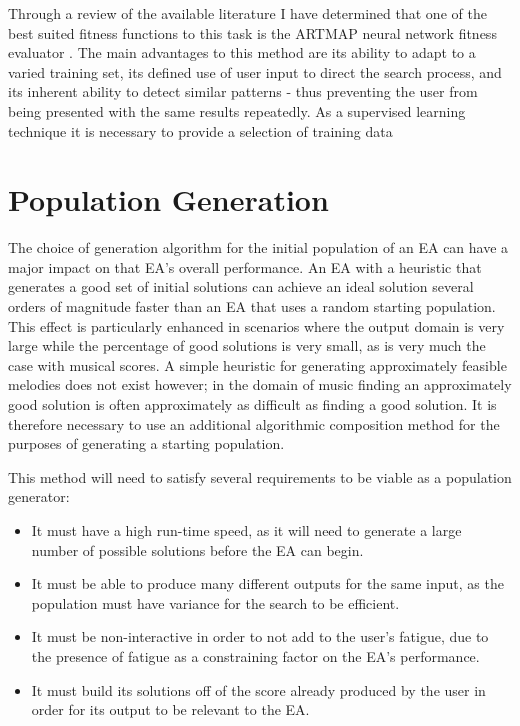 \documentclass[ author={Stephen Livermore-Tozer},
				supervisor={Dr. Peter Flach},
				degree={MEng},
				title={Performing Algorithmic Co-composition Using Machine Learning},
				subtitle={},
				type={research},
				year={2016} ]{dissertation}
\begin{document}
	Through a review of the available literature I have determined that one of the best suited fitness functions to this task is the ARTMAP neural network fitness evaluator \cite{burton1998hybrid}. The main advantages to this method are its ability to adapt to a varied training set, its defined use of user input to direct the search process, and its inherent ability to detect similar patterns - thus preventing the user from being presented with the same results repeatedly. As a supervised learning technique it is necessary to provide a selection of training data
	
	\section{Population Generation}
	\label{sec:pop-gen}
	
	The choice of generation algorithm for the initial population of an EA can have a major impact on that EA's overall performance. An EA with a heuristic that generates a good set of initial solutions can achieve an ideal solution several orders of magnitude faster than an EA that uses a random starting population. This effect is particularly enhanced in scenarios where the output domain is very large while the percentage of good solutions is very small, as is very much the case with musical scores. A simple heuristic for generating approximately feasible melodies does not exist however; in the domain of music finding an approximately good solution is often approximately as difficult as finding a good solution. It is therefore necessary to use an additional algorithmic composition method for the purposes of generating a starting population.
	
	This method will need to satisfy several requirements to be viable as a population generator:
	
	\begin{itemize}
		\item It must have a high run-time speed, as it will need to generate a large number of possible solutions before the EA can begin.
		\item It must be able to produce many different outputs for the same input, as the population must have variance for the search to be efficient.
		\item It must be non-interactive in order to not add to the user's fatigue, due to the presence of fatigue as a constraining factor on the EA's performance.
		\item It must build its solutions off of the score already produced by the user in order for its output to be relevant to the EA.
	\end{itemize}
	
\end{document}
